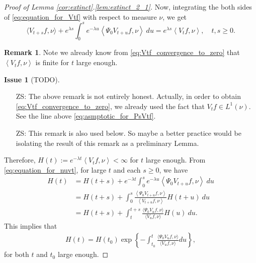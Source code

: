 \documentclass[12pt,a4paper]{amsart}
\numberwithin{equation}{section}
\theoremstyle{plain}
\theoremstyle{definition}
\newtheorem{iss}{Issue}
\newtheorem{rem}[thm]{Remark}
\begin{document}
\begin{proof}[Proof of Lemma \ref{cor:extinct}.\eqref{lem:extinct_2_1}]
Now,  integrating the both sides of \eqref{eq:equation_for_Vtf} with respect to measure $\nu$, we get
\begin{equation}
\label{eq:equation_for_nuvt}
    \langle V_{t+s}f, \nu\rangle + e^{\lambda s}\int_0^s e^{-\lambda u}\left\langle \Psi_0 V_{t+u} f,\nu\right\rangle~du
    = e^{\lambda s}\left\langle V_tf,\nu \right\rangle,
\quad t,s \geq 0.
\end{equation}  
\begin{rem}
\label{rem:Vtfnu_is_finite_when_t_is_large}
Note we already know from \eqref{eq:Vtf_convergence_to_zero} that $\left\langle V_tf,\nu \right\rangle$ is finite for $t$ large enough.
\begin{iss}[TODO]~
  \begin{itemize}
  \item[ZS:]
The above remark is not entirely honest. 
Actually, in order to obtain \eqref{eq:Vtf_convergence_to_zero}, we already used the fact that $V_tf\in L^1(\nu)$.
See the line above \eqref{eq:asmptotic_for_PsVtf}.
\item[ZS:]
This remark is also used below.
So maybe a better practice would be isolating the result of this remark as a preliminary Lemma.
  \end{itemize}
\end{iss}
\end{rem}
Therefore, $H(t):=e^{-\lambda t}\left\langle V_tf,\nu \right\rangle<\infty$ for $t$ large enough.
From \eqref{eq:equation_for_nuvt}, for large $t$ and each $s\geq 0$, we have 
\begin{align}
H(t)
&= H(t+s) + e^{-\lambda t}\int_0^{s} e^{-\lambda u} \left\langle\Psi_0 V_{t+u}f,\nu\right\rangle~du
\\&=H(t+s) + \int_0^{s}  \frac{\left\langle\Psi_0 V_{t+u} f,\nu\right\rangle}{ \left\langle V_{t+u} f,\nu \right\rangle } H(t+u)~du   
\\&=H(t+s) + \int_t^{t+s}\frac{\langle\Psi_0 V_uf,\nu\rangle}{\langle V_uf,\nu\rangle}H(u)~du. 
\end{align}
This implies that 
\begin{align}
\label{eq:Ht}
H(t)
=H(t_0) \exp\left\{-\int_{t_0}^t\frac{\langle\Psi_0 V_uf,\nu\rangle}{\langle V_uf,\nu\rangle}du\right\},
\end{align}
for both $t$ and $t_0$ large enough.  


\end{proof}
\end{document}
